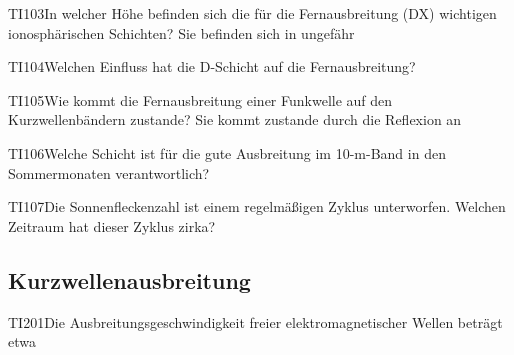 \begin{question}{TI103}{In welcher Höhe befinden sich die für die Fernausbreitung (DX) wichtigen ionosphärischen Schichten? Sie befinden sich in ungefähr}
\end{question}

\begin{question}{TI104}{Welchen Einfluss hat die D-Schicht auf die Fernausbreitung?}
\end{question}

\begin{question}{TI105}{Wie kommt die Fernausbreitung einer Funkwelle auf den Kurzwellenbändern zustande? Sie kommt zustande durch die Reflexion an}
\end{question}

\begin{question}{TI106}{Welche Schicht ist für die gute Ausbreitung im 10-m-Band in den Sommermonaten verantwortlich?}
\end{question}

\begin{question}{TI107}{Die Sonnenfleckenzahl ist einem regelmäßigen Zyklus unterworfen. Welchen Zeitraum hat dieser Zyklus zirka?}
\end{question}

\subsection{Kurzwellenausbreitung}

\begin{question}{TI201}{Die Ausbreitungsgeschwindigkeit freier elektromagnetischer Wellen beträgt etwa}
\end{question}

